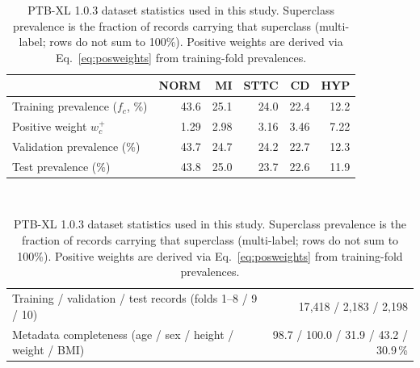 \documentclass[mathematics,article,pdftex]{Definitions/mdpi}
\def\textbf#1{#1}%
\begin{document}
\begin{table}[H]
\caption{PTB-XL 1.0.3 dataset statistics used in this study. Superclass prevalence is the fraction of records carrying that superclass (multi-label; rows do not sum to 100\%). Positive weights are derived via Eq.~\eqref{eq:posweights} from training-fold prevalences.}
\label{tab:dataset}
\centering
\small
\begin{tabular}{lrrrrr}
\toprule
 & \textbf{NORM} & \textbf{MI} & \textbf{STTC} & \textbf{CD} & \textbf{HYP} \\
\midrule
Training prevalence ($f_c$, \%)       & 43.6 & 25.1 & 24.0 & 22.4 & 12.2 \\
Positive weight $w_c^{+}$             & 1.29 & 2.98 & 3.16 & 3.46 & 7.22 \\
Validation prevalence (\%)            & 43.7 & 24.7 & 24.2 & 22.7 & 12.3 \\
Test prevalence (\%)                  & 43.8 & 25.0 & 23.7 & 22.6 & 11.9 \\
\bottomrule
\end{tabular}
\vspace{3pt}\\
\begin{tabularx}{\textwidth}{@{}>{\raggedright\arraybackslash}Xr@{}}
\toprule
Training / validation / test records (folds 1--8 / 9 / 10) & 17{,}418 / 2{,}183 / 2{,}198 \\
Metadata completeness (age / sex / height / weight / BMI) & 98.7 / 100.0 / 31.9 / 43.2 / 30.9\,\% \\
\bottomrule
\end{tabularx}
\end{table}
\end{document}
